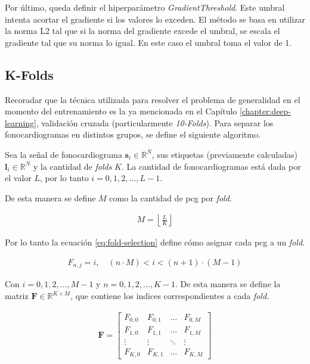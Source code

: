 \indent Por último, queda definir el hiperparámetro \textit{GradientThreshold}. Este umbral intenta acortar el gradiente si los valores lo exceden. El método se basa en utilizar la norma L2 tal que si la norma del gradiente excede el umbral, se escala el gradiente tal que su norma lo igual. En este caso el umbral toma el valor de 1.

\subsection{K-Folds}

\indent Recoradar que la técnica utilizada para resolver el problema de generalidad en el momento del entrenamiento es la ya mencionada en el Capítulo \ref{chapter:deep-learning}, validación cruzada (particularmente \textit{10-Folds}). Para separar los fonocardiogramas en distintos grupos, se define el siguiente algoritmo. \bigskip

\indent Sea la señal de fonocardiograma $\mathbf{s}_i \in \mathbb{R}^N$, sus etiquetas (previamente calculadas) $\mathbf{l}_i \in \mathbb{R}^N$ y la cantidad de \textit{folds} $K$. La cantidad de fonocardiogramas está dada por el valor $L$, por lo tanto $i = 0,1,2,\dots,L-1$. \bigskip

\indent De esta manera se define $M$ como la cantidad de \acrshort{pcg} por \textit{fold}. 

\begin{align}
    M = \left\lfloor \frac{L}{K} \right\rfloor
\end{align}

\indent Por lo tanto la ecuación \ref{eq:fold-selection} define cómo asignar cada \acrshort{pcg} a un \textit{fold}.

\begin{align} \label{eq:fold-selection}
    F_{n,j} = i, \quad (n \cdot M) < i < (n+1) \cdot (M-1)
\end{align}

\indent Con $i=0,1,2,\dots,M-1$ y $n = 0,1,2,\dots,K-1$. De esta manera se define la matriz $\bm{F} \in \mathbb{R}^{K \times M}$, que contiene los indices correspondientes a cada \textit{fold}.

\begin{align}
    \bm{F} = \left[\begin{array}{ccccc}
         F_{0,0} & F_{0,1} & \dots & F_{0,M} \\
         F_{1,0} & F_{1,1} & \dots & F_{1,M} \\
         \vdots  & \vdots  & \ddots & \vdots \\
         F_{K,0} & F_{K,1} & \dots & F_{K,M}
    \end{array}\right]
\end{align}

